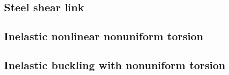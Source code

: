 
\subsection{Steel shear link }\label{sec:frame-2007}



\subsection{Inelastic nonlinear nonuniform torsion }\label{sec:frame-3011}
% 
\clearpage

\subsection{Inelastic buckling with nonuniform torsion }\label{sec:frame-3032}


% 


